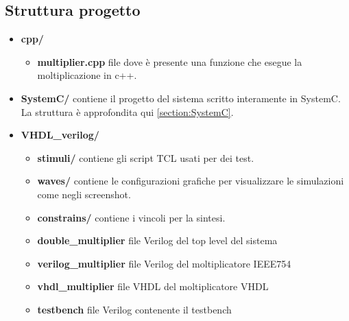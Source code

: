 \documentclass[]{IEEEtran}
\begin{document}
\subsection{Struttura progetto}
\begin{itemize}
    \item \textbf{cpp/}
    \begin{itemize}
        \item \textbf{multiplier.cpp} file dove è presente una funzione che esegue la moltiplicazione in c++.
    \end{itemize}
    \item \textbf{SystemC/} contiene il progetto del sistema scritto interamente in 
    SystemC. La struttura è approfondita qui \ref{section:SystemC}.
    \item \textbf{VHDL\_verilog/}
    \begin{itemize}
        \item \textbf{stimuli/} contiene gli script TCL usati per dei test.
        \item \textbf{waves/} contiene le configurazioni grafiche per visualizzare le simulazioni come negli screenshot.
        \item \textbf{constrains/} contiene i vincoli per la sintesi.
        \item \textbf{double\_multiplier} file Verilog del top level del sistema
        \item \textbf{verilog\_multiplier} file Verilog del moltiplicatore IEEE754
        \item \textbf{vhdl\_multiplier} file VHDL del moltiplicatore VHDL
        \item \textbf{testbench} file Verilog contenente il testbench
    \end{itemize}
\end{itemize}
\end{document}

